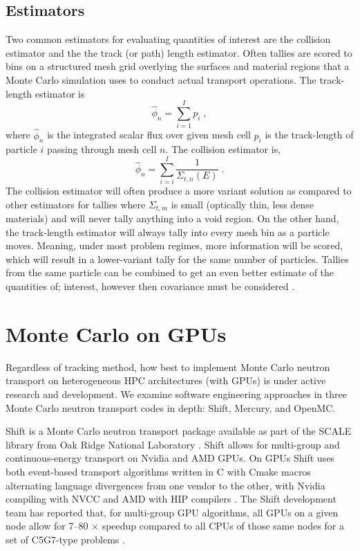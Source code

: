 \subsection{Estimators}
\label{c5:estimators}

Two common estimators for evaluating quantities of interest are the collision estimator and the the track (or path) length estimator.
Often tallies are scored to bins on a structured mesh grid overlying the surfaces and material regions that a Monte Carlo simulation uses to conduct actual transport operations.
The track-length estimator is
\begin{equation}
    \hat{\phi}_n = \sum_{i=1}^{I}p_i \; ,
\end{equation}
where $\hat{\phi}_n$ is the integrated scalar flux over given mesh cell $p_i$ is the track-length of particle $i$ passing through mesh cell $n$.
The collision estimator is,
\begin{equation}
    \hat{\phi}_n = \sum_{i=i}^{I} \frac{1}{\Sigma_{t,n}(E)} \;.
\end{equation}
The collision estimator will often produce a more variant solution as compared to other estimators for tallies where $\Sigma_{t,m}$ is small (optically thin, less dense materials) and will never tally anything into a void region.
On the other hand, the track-length estimator will always tally into every mesh bin as a particle moves.
Meaning, under most problem regimes, more information will be scored, which will result in a lower-variant tally for the same number of particles.
Tallies from the same particle can be combined to get an even better estimate of the quantities of; interest, however then covariance must be considered \cite{urbatsch_estimation_1995}.


\section{Monte Carlo on GPUs}

Regardless of tracking method, how best to implement Monte Carlo neutron transport on heterogeneous HPC architectures (with GPUs) is under active research and development.
We examine software engineering approaches in three Monte Carlo neutron transport codes in depth: Shift, Mercury, and OpenMC.

Shift is a Monte Carlo neutron transport package available as part of the SCALE library from Oak Ridge National Laboratory \cite{pandya_implementation_2016}.
Shift allows for multi-group and continuous-energy transport on Nvidia and AMD GPUs.
On GPUs Shift uses both event-based transport algorithms written in C with Cmake macros alternating language divergences from one vendor to the other, with Nvidia compiling with NVCC and AMD with HIP compilers \cite{mcsummit}.
The Shift development team has reported that, for multi-group GPU algorithms, all GPUs on a given node allow for 7--80 $\times$ speedup compared to all CPUs of those same nodes for a set of C5G7-type problems \cite{hamilton_multigroup_2018}.

